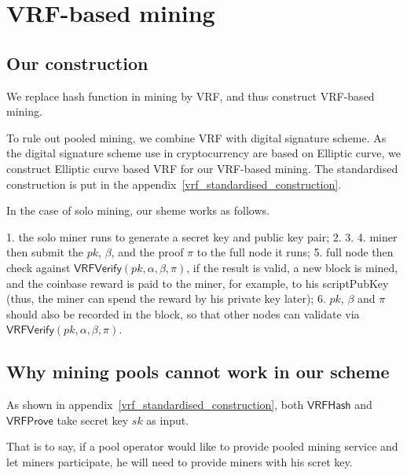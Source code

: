 \section{VRF-based mining}

\subsection{Our construction}

We replace hash function in mining by VRF, and thus construct VRF-based mining.

To rule out pooled mining, we combine VRF with digital signature scheme.
As the digital signature scheme use in cryptocurrency are based on Elliptic curve, we construct Elliptic curve based VRF for our VRF-based mining.
The standardised construction is put in the appendix~\ref{vrf_standardised_construction}.


In the case of solo mining, our sheme works as follows.

1. the solo miner runs  to generate a secret key and public key pair;
2.
3.
4. miner then submit the $pk$, $\beta$, and the proof $\pi$ to the full node it runs;
5. full node then check against $\mathsf{VRFVerify}(pk, \alpha, \beta, \pi)$, if the result is valid, a new block is mined, and the coinbase reward is paid to the miner, for example, to his scriptPubKey (thus, the miner can spend the reward by his private key later);
6. $pk$, $\beta$ and $\pi$ should also be recorded in the block, so that other nodes can validate via $\mathsf{VRFVerify}(pk, \alpha, \beta, \pi)$.

\subsection{Why mining pools cannot work in our scheme}

As shown in appendix~\ref{vrf_standardised_construction}, both $\mathsf{VRFHash}$ and $\mathsf{VRFProve}$ take secret key $sk$ as input.

That is to say, if a pool operator would like to provide pooled mining service and let miners participate, he will need to provide miners with his scret key.


